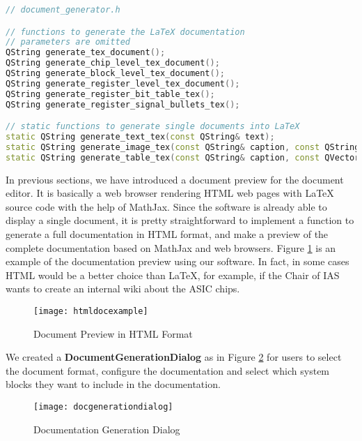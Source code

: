 \begin{minipage}{\linewidth}
\begin{lstlisting}[language=C++, caption={Definition of the Document Generator\label{lst:Definition of the Document Generator}}]
// document_generator.h

// functions to generate the LaTeX documentation
// parameters are omitted
QString generate_tex_document();
QString generate_chip_level_tex_document();
QString generate_block_level_tex_document();
QString generate_register_level_tex_document();
QString generate_register_bit_table_tex();
QString generate_register_signal_bullets_tex();

// static functions to generate single documents into LaTeX
static QString generate_text_tex(const QString& text);
static QString generate_image_tex(const QString& caption, const QString& width, const QString& path);
static QString generate_table_tex(const QString& caption, const QVector<QVector<QString> >& cells);
\end{lstlisting}
\end{minipage}

In previous sections, we have introduced a document preview for the document editor. It is basically a web browser rendering HTML web pages with LaTeX source code with the help of MathJax. Since the software is already able to display a single document, it is pretty straightforward to implement a function to generate a full documentation in HTML format, and make a preview of the complete documentation based on MathJax and web browsers. Figure \ref{fig:Document Preview in HTML Format} is an example of the documentation preview using our software. In fact, in some cases HTML would be a better choice than LaTeX, for example, if the Chair of IAS wants to create an internal wiki about the ASIC chips.

\begin{figure}[htb]
\centering
\texttt{[image: htmldocexample]}
\caption{Document Preview in HTML Format\label{fig:Document Preview in HTML Format}}
\end{figure} 

We created a \textbf{DocumentGenerationDialog} as in Figure \ref{fig:Documentation Generation Dialog} for users to select the document format, configure the documentation and select which system blocks they want to include in the documentation. 

\begin{figure}[htb]
\centering
\texttt{[image: docgenerationdialog]}
\caption{Documentation Generation Dialog\label{fig:Documentation Generation Dialog}}
\end{figure} 
